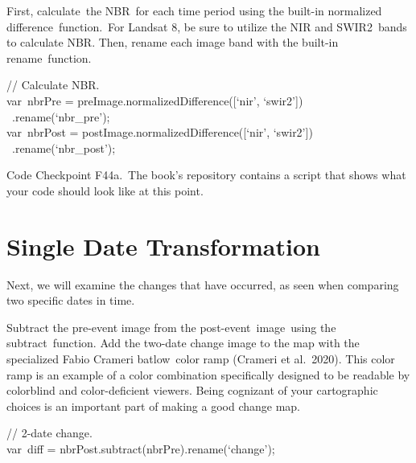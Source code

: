 \documentclass[
  letterpaper,
  DIV=11,
  numbers=noendperiod]{scrreprt}
\begin{document}
First, calculate~the NBR~for each time period using the built-in
normalized difference~function.~For Landsat 8, be sure to utilize the
NIR and SWIR2~bands to calculate NBR. Then, rename each image band with
the built-in rename~function.

// Calculate NBR.\\
var~nbrPre = preImage.normalizedDifference({[}`nir', `swir2'{]})\\
\hspace*{0.333em} ~.rename(`nbr\_pre');\\
var~nbrPost = postImage.normalizedDifference({[}`nir', `swir2'{]})\\
\hspace*{0.333em} ~.rename(`nbr\_post');

\begin{tcolorbox}[enhanced jigsaw, left=2mm, breakable, rightrule=.15mm, opacityback=0, colframe=quarto-callout-note-color-frame, colbacktitle=quarto-callout-note-color!10!white, arc=.35mm, opacitybacktitle=0.6, toptitle=1mm, colback=white, leftrule=.75mm, title=\textcolor{quarto-callout-note-color}{\faInfo}\hspace{0.5em}{Note}, toprule=.15mm, bottomtitle=1mm, titlerule=0mm, bottomrule=.15mm, coltitle=black]

Code Checkpoint F44a.~The book's repository contains a script that shows
what your code should look like at this point.

\end{tcolorbox}

\hypertarget{single-date-transformation}{%
\section{Single Date Transformation}\label{single-date-transformation}}

Next, we will examine the changes that have occurred, as seen when
comparing two specific dates in time.

Subtract the pre-event image from the post-event~image~using the
subtract~function. Add the two-date change image to the map with the
specialized Fabio Crameri batlow~color ramp (Crameri et al.~2020). This
color ramp is an example of a color combination specifically designed to
be readable by colorblind and color-deficient viewers. Being cognizant
of your cartographic choices is an important part of making a good
change map.

// 2-date change.\\
var~diff = nbrPost.subtract(nbrPre).rename(`change');
\end{document}

